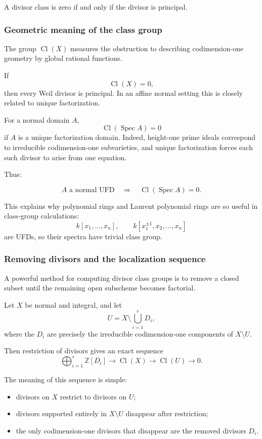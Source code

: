 \documentclass[12pt,a4paper]{article}
\DeclareMathOperator{\Spec}{Spec}
\newcommand{\Z}{\mathbb{Z}}
\newcommand{\Cl}{\operatorname{Cl}}
\providecommand{\Spec}{\operatorname{Spec}}
\theoremstyle{notespace}
\begin{document}
A divisor class is zero if and only if the divisor is principal.

\subsubsection{Geometric meaning of the class group}

The group \(\Cl(X)\) measures the obstruction to describing codimension-one geometry by global rational functions.

If
\[
\Cl(X)=0,
\]
then every Weil divisor is principal. In an affine normal setting this is closely related to unique factorization.

For a normal domain \(A\),
\[
\Cl(\Spec A)=0
\]
if \(A\) is a unique factorization domain. Indeed, height-one prime ideals correspond to irreducible codimension-one subvarieties, and unique factorization forces each such divisor to arise from one equation.

Thus:

\[
\boxed{
	A\text{ a normal UFD}
	\quad\Longrightarrow\quad
	\Cl(\Spec A)=0.
}
\]

This explains why polynomial rings and Laurent polynomial rings are so useful in class-group calculations:
\[
k[x_1,\dots,x_n],
\qquad
k[x_1^{\pm 1},x_2,\dots,x_n]
\]
are UFDs, so their spectra have trivial class group.

\subsubsection{Removing divisors and the localization sequence}

A powerful method for computing divisor class groups is to remove a closed subset until the remaining open subscheme becomes factorial.

Let \(X\) be normal and integral, and let
\[
U=X\setminus \bigcup_{i=1}^{r}D_i,
\]
where the \(D_i\) are precisely the irreducible codimension-one components of \(X\setminus U\).

Then restriction of divisors gives an exact sequence
\[
\bigoplus_{i=1}^{r}\Z[D_i]
\longrightarrow
\Cl(X)
\longrightarrow
\Cl(U)
\longrightarrow 0.
\]

The meaning of this sequence is simple:

\begin{itemize}
	\item divisors on \(X\) restrict to divisors on \(U\);
	\item divisors supported entirely in \(X\setminus U\) disappear after restriction;
	\item the only codimension-one divisors that disappear are the removed divisors \(D_i\).
\end{itemize}
\end{document}

